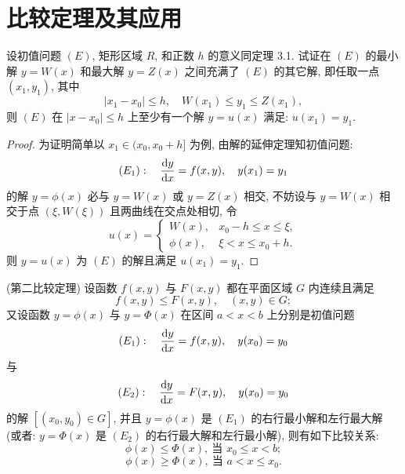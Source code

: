 \section{比较定理及其应用}



\begin{exercise}
  设初值问题 $(E)$, 矩形区域 $R$, 和正数 $h$ 的意义同定理 3.1.
  试证在 $(E)$ 的最小解 $y=W(x)$ 和最大解 $y=Z(x)$ 之间充满了 $(E)$ 的其它解,
  即任取一点 $(x_1,y_1)$, 其中
  \[|x_1-x_0|\leq h,\quad W(x_1)\leq y_1\leq Z(x_1),\]
  则 $(E)$ 在 $|x-x_0|\leq h$ 上至少有一个解 $y=u(x)$ 满足: $u(x_1)=y_1$.
\end{exercise}

\begin{proof}
  为证明简单以 $x_1\in(x_0,x_0+h]$ 为例, 由解的延伸定理知初值问题:
  \[(E_1):\quad \frac{\mathop{}\!\mathrm{d} y}{\mathop{}\!\mathrm{d} x}=f(x,y),\quad y(x_1)=y_1\]
  的解 $y=\phi(x)$ 必与 $y=W(x)$ 或 $y=Z(x)$ 相交,
  不妨设与 $y=W(x)$ 相交于点 $(\xi,W(\xi))$ 且两曲线在交点处相切, 令
  \[u(x)=\begin{cases}
    W(x),    & x_0-h\leq x\leq\xi,\\
    \phi(x), & \xi<x\leq x_0+h.
  \end{cases}\]
  则 $y=u(x)$ 为 $(E)$ 的解且满足 $u(x_1)=y_1$.
\end{proof}



\begin{exercise}(第二比较定理) 
  设函数 $f(x,y)$ 与 $F(x,y)$ 都在平面区域 $G$ 内连续且满足
  \[f(x,y)\leq F(x,y),\quad (x,y)\in G;\]
  又设函数 $y=\phi(x)$ 与 $y=\varPhi(x)$ 在区间 $a<x<b$ 上分别是初值问题
  \[(E_1):\quad \frac{\mathop{}\!\mathrm{d} y}{\mathop{}\!\mathrm{d} x}=f(x,y),\quad y(x_0)=y_0\]
  与
  \[(E_2):\quad \frac{\mathop{}\!\mathrm{d} y}{\mathop{}\!\mathrm{d} x}=F(x,y),\quad y(x_0)=y_0\]
  的解 $[(x_0,y_0)\in G]$, 并且 $y=\phi(x)$ 是 $(E_1)$ 的右行最小解和左行最大解
  (或者: $y=\varPhi(x)$ 是 $(E_2)$ 的右行最大解和左行最小解), 则有如下比较关系:
  \[\phi(x)\leq\varPhi(x),\ \text{当\ } x_0\leq x<b;\]
  \[\phi(x)\geq\varPhi(x),\ \text{当\ } a<x\leq x_0.\]
\end{exercise}

